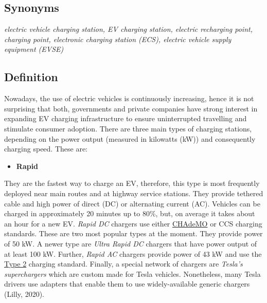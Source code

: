\documentclass[
]{book}
\providecommand{\tightlist}{%
  \setlength{\itemsep}{0pt}\setlength{\parskip}{0pt}}
\begin{document}
\hypertarget{synonyms-6}{%
\subsection*{Synonyms}\label{synonyms-6}}

\emph{electric vehicle charging station, EV charging station, electric recharging point, charging point, electronic charging station (ECS), electric vehicle supply equipment (EVSE)}

\hypertarget{definition-7}{%
\subsection*{Definition}\label{definition-7}}

Nowadays, the use of electric vehicles is continuously increasing, hence it is not surprising that both, governments and private companies have strong interest in expanding EV charging infrastructure to ensure uninterrupted travelling and stimulate consumer adoption. There are three main types of charging stations, depending on the power output (measured in kilowatts (kW)) and consequently charging speed. These are:

\begin{itemize}
\tightlist
\item
  \textbf{Rapid}
\end{itemize}

They are the fastest way to charge an EV, therefore, this type is most frequently deployed near main routes and at highway service stations. They provide tethered cable and high power of direct (DC) or alternating current (AC). Vehicles can be charged in approximately 20 minutes up to 80\%, but, on average it takes about an hour for a new EV. \emph{Rapid DC} chargers use either \href{https://chademo.com/}{CHAdeMO} or CCS charging standards. These are two most popular types at the moment. They provide power of 50 kW. A newer type are \emph{Ultra Rapid DC} chargers that have power output of at least 100 kW. Further, \emph{Rapid AC} chargers provide power of 43 kW and use the \href{https://www.mobilityhouse.com/int_en/knowledge-center/charging-cable-and-plug-types\#:~:text=Type\%202\%20plug,-The\%20triple\%2Dphase\&text=In\%20private\%20spaces\%2C\%20charging\%20power,with\%20a\%20type\%202\%20socket.}{Type 2} charging standard. Finally, a special network of chargers are \emph{Tesla's superchargers} which are custom made for Tesla vehicles. Nonetheless, many Tesla drivers use adapters that enable them to use widely-available generic chargers (Lilly, 2020).
\end{document}
